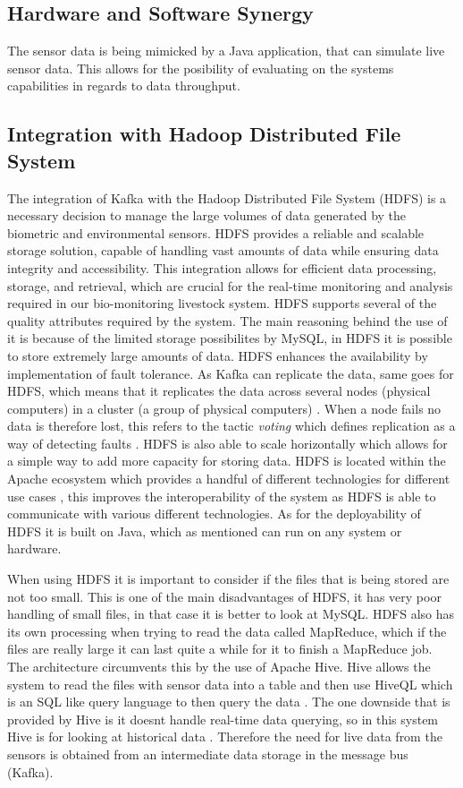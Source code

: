 \documentclass[conference]{IEEEtran}
\begin{document}
\subsection{Hardware and Software Synergy}
The sensor data is being mimicked by a Java application, that can simulate live sensor data. This allows for the posibility of evaluating on the systems capabilities in regards to data throughput.

\subsection{Integration with Hadoop Distributed File System}
The integration of Kafka with the Hadoop Distributed File System (HDFS) is a necessary decision to manage the large volumes of data generated by the biometric and environmental sensors. HDFS provides a reliable and scalable storage solution, capable of handling vast amounts of data while ensuring data integrity and accessibility. This integration allows for efficient data processing, storage, and retrieval, which are crucial for the real-time monitoring and analysis required in our bio-monitoring livestock system.
HDFS supports several of the quality attributes required by the system. The main reasoning behind the use of it is because of the limited storage possibilites by MySQL, in HDFS it is possible to store extremely large amounts of data.
HDFS enhances the availability by implementation of fault tolerance. As Kafka can replicate the data, same goes for HDFS, which means that it replicates the data across several nodes (physical computers) in a cluster (a group of physical computers) \cite{AltexSoft_2022a}. When a node fails no data is therefore lost, this refers to the tactic \textit{voting} which defines replication as a way of detecting faults \cite{Bass2012Software}.
HDFS is also able to scale horizontally which allows for a simple way to add more capacity for storing data. HDFS is located within the Apache ecosystem which provides a handful of different technologies for different use cases \cite{AltexSoft_2022a}, this improves the interoperability of the system as HDFS is able to communicate with various different technologies. As for the deployability of HDFS it is built on Java, which as mentioned can run on any system or hardware.

When using HDFS it is important to consider if the files that is being stored are not too small. This is one of the main disadvantages of HDFS, it has very poor handling of small files, in that case it is better to look at MySQL.
HDFS also has its own processing when trying to read the data called MapReduce, which if the files are really large it can last quite a while for it to finish a MapReduce job. The architecture circumvents this by the use of Apache Hive. Hive allows the system to read the files with sensor data into a table and then use HiveQL which is an SQL like query language to then query the data \cite{ApacheHive}.
The one downside that is provided by Hive is it doesnt handle real-time data querying, so in this system Hive is for looking at historical data \cite{ApacheHive}. Therefore the need for live data from the sensors is obtained from an intermediate data storage in the message bus (Kafka).
\end{document}
